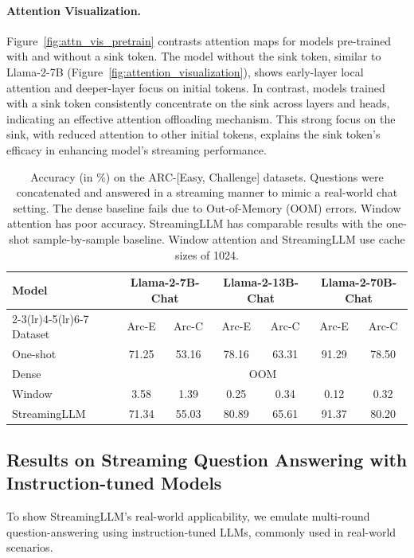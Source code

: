 \documentclass{article} \usepackage{iclr2024_conference,times}
\def\method{StreamingLLM\xspace}
\newcommand{\myparagraph}[1]{\vspace{0pt}\paragraph{#1}}
\begin{document}
\myparagraph{Attention Visualization.} 
Figure~\ref{fig:attn_vis_pretrain} contrasts attention maps for models pre-trained with and without a sink token. The model without the sink token, similar to Llama-2-7B (Figure~\ref{fig:attention_visualization}), shows early-layer local attention and deeper-layer focus on initial tokens. In contrast, models trained with a sink token consistently concentrate on the sink across layers and heads, indicating an effective attention offloading mechanism. This strong focus on the sink, with reduced attention to other initial tokens, explains the sink token's efficacy in enhancing model's streaming performance.

\begin{table}
\centering
\setlength{\tabcolsep}{2pt}
\small
\caption{\small Accuracy (in \%) on the ARC-[Easy, Challenge] datasets. Questions were concatenated and answered in a streaming manner to mimic a real-world chat setting. The dense baseline fails due to Out-of-Memory (OOM) errors. Window attention has poor accuracy. \method has comparable results with the one-shot sample-by-sample baseline. Window attention and \method use cache sizes of 1024.}
\label{tab:instruct_qa}
\vspace{-1em}
\begin{tabular}{lcccccc}
\toprule
Model     & \multicolumn{2}{c}{Llama-2-7B-Chat} &\multicolumn{2}{c}{Llama-2-13B-Chat}        & \multicolumn{2}{c}{Llama-2-70B-Chat}  \\
\cmidrule(lr){2-3}\cmidrule(lr){4-5}\cmidrule(lr){6-7}
Dataset   & Arc-E                & Arc-C                & Arc-E                & Arc-C                & Arc-E                & Arc-C                 \\
\midrule
One-shot    & 71.25              & 53.16              & 78.16              & 63.31              & 91.29              & 78.50               \\
\midrule
Dense     & \multicolumn{6}{c}{OOM}   \\
Window    & 3.58               & 1.39               & 0.25               & 0.34               & 0.12               & 0.32                \\
\method & 71.34              & 55.03              & 80.89              & 65.61              & 91.37              & 80.20              \\
\bottomrule
\end{tabular}
\vspace{-1.5em}
\end{table}
 \subsection{Results on Streaming Question Answering with Instruction-tuned Models}
To show \method's real-world applicability, we emulate multi-round question-answering using instruction-tuned LLMs, commonly used in real-world scenarios.
\end{document}
